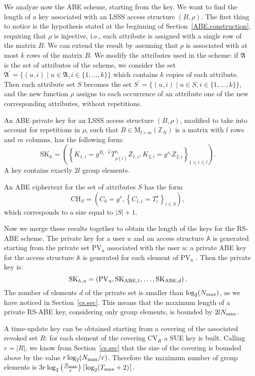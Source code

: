 \documentclass[a4paper,10pt]{article}
\newcommand{\Z}{\mathbb{Z}}
\newcommand{\varRow}{l}
\newcommand{\varColumn}{m}
\newcommand{\matrixset}[3]{\text{M}_{#1\times #2}(#3)}
\begin{document}
	We analyze now the ABE scheme, starting from the key. We want to find the length of a key associated with an LSSS access structure $(B,\rho)$. The first thing to notice is the hypothesis stated at the beginning of Section~\ref{ABE.construction}, requiring that $\rho$ is injective, i.e., each attribute is assigned with a single row of the matrix $B$. We can extend the result by assuming that $\rho$ is associated with at most $k$ rows of the matrix $B$. We modify the attributes used in the scheme: if $\mathfrak{A}$ is the set of attributes of the scheme, we consider the set $\mathfrak{A}^\prime=\{(u,i)\mid u\in\mathfrak{A},i\in\{1,\ldots,k\}\}$ which contains $k$ copies of each attribute. Then each attribute set $S$ becomes the set $S^\prime=\{(u,i)\mid u\in S,i\in\{1,\ldots,k\}\}$, and the new function $\rho$ assigns to each occurrence of an attribute one of the new corresponding attributes, without repetitions.
	
	An ABE private key for an LSSS access structure $(B,\rho)$, modified to take into account for repetitions in $\rho$, such that $B\in \matrixset{\varRow}{\varColumn}{\Z_N}$ is a matrix with $\varRow$ rows and $\varColumn$ columns, has the following form:
	\[
		\mathrm{SK}_{\mathbb{A}}=\left(\left\{K_{1,i}=g^{B_i\cdot \vec{v}} T_{\rho(i)}^{s_i} Z_{1,i}, K_{2,i}=g^{s_i} Z_{2,i}\right\}_{1\leq i\leq \varRow} \right).
	\]
	A key contains exactly $2l$ group elements.
	
	An ABE ciphertext for the set of attributes $S$ has the form\[
		\mathrm{CH}_{S}=\left(C_0=g^s,\left\{C_{1,i}=T_i^s\right\}_{i\in S} \right),
	\]
	which corresponds to a size equal to $|S|+1$.
	
	Now we merge these results together to obtain the length of the keys for the RS-ABE scheme.
	The private key for a user $u$ and an access structure $\mathbb{A}$ is generated starting from the private set $\mathrm{PV}_u$ associated with the user $u$: a private ABE key for the access structure $\mathbb{A}$ is generated for each element of $\mathrm{PV}_u$ . Then the private key is: \[
		\mathrm{SK}_{\mathbb{A},u}=\left( \mathrm{PV}_u, \mathrm{SK}_{\textnormal{ABE},1}, \ldots, \mathrm{SK}_{\textnormal{ABE},d} \right).
	\]
	The number of elements $d$ of the private set is smaller than $\log_2(N_\textnormal{max})$, as we have noticed in Section~\ref{cs.sec}. This means that the maximum length of a private RS-ABE key, considering only group elements, is bounded by $2 l N_\textnormal{max}$.
	
	A time-update key can be obtained starting from a covering of the associated revoked set $R$: for each element of the covering $\mathrm{CV}_R$ a SUE key is built. Calling $r=|R|$, we know from Section~\ref{cs.sec} that the size of the covering is bounded above by the value $r \log_2 (N_\textnormal{max}/r)$. Therefore the maximum number of group elements is	$3 r \log_2 \left(\frac{N_\textnormal{max}}{r}\right)  \left\lceil \log_2(T_\textnormal{max}+2) \right\rceil$.
	
\end{document}
